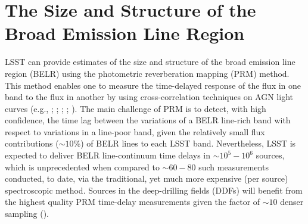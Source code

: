 %
%
%
%
%
%
%

\section{The Size and Structure of the Broad Emission Line Region}
\def\secname{\chpname:photoRM}\label{sec:\secname}




LSST can provide estimates of the size and structure of the broad
emission line region (BELR) using the photometric reverberation
mapping (PRM) method. This method enables one to measure the
time-delayed response of the flux in one band to the flux
in another by using cross-correlation techniques on AGN light
curves (e.g., \citet{Chelouche2013}; \citet{CheloucheandZucker2013};
\citet{CheloucheEtal2014}; \citet{EdelsonEtal2015};
\citet{FausnaughEtal2015}). The main challenge of PRM is to detect,
with high confidence, the time lag between the variations of a BELR
line-rich band with respect to variations in a line-poor band, given
the relatively small flux contributions ($\sim 10$\%) of BELR lines to each
LSST band. Nevertheless, LSST is expected to deliver BELR line-continuum
time delays in $\sim10^5-10^6$ sources, which is unprecedented when
compared to $\sim60-80$ such measurements conducted, to date, via the
traditional, yet much more expensive (per source) spectroscopic method.
Sources in the deep-drilling fields (DDFs) will benefit from the highest
quality PRM time-delay measurements given the factor of $\sim10$ denser
sampling (\citet{CheloucheEtal2014}).

